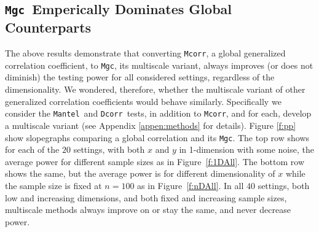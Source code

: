 \documentclass[11pt]{article}
\providecommand{\sct}[1]{{\sc \texttt{#1}}}
\newcommand{\Mgc}{\sct{Mgc}}
\newcommand{\Dcorr}{\sct{Dcorr}}
\newcommand{\Mcorr}{\sct{Mcorr}}
\newcommand{\Mantel}{\sct{Mantel}}
\begin{document}
\subsection*{\Mgc~Emperically Dominates Global Counterparts}

The above results demonstrate that converting \Mcorr, a global generalized correlation coefficient, to \Mgc, its multiscale variant, always improves (or does not diminish) the testing power for all considered settings, regardless of the dimensionality.  We wondered, therefore, whether the multiscale variant of other generalized correlation coefficients would behave similarly.  Specifically we consider the \Mantel~and \Dcorr~tests, in addition to \Mcorr, and for each, develop a multiscale variant (see Appendix \ref{appen:methods} for details). 
% 
Figure \ref{f:pp} show slopegraphs comparing a global correlation and its \Mgc.  The top row shows for each of the $20$ settings, with both $x$ and $y$ in 1-dimension with some noise, the average power for different sample sizes as in Figure~\ref{f:1DAll}.  The bottom row shows the same, but the average power is for different dimensionality of $x$ while the sample size is fixed at $n=100$ as in Figure~\ref{f:nDAll}.  In all $40$ settings, both low and increasing dimensions, and both fixed and increasing sample sizes, multiscale methods always improve on or stay the same, and never decrease power. 


\end{document}
